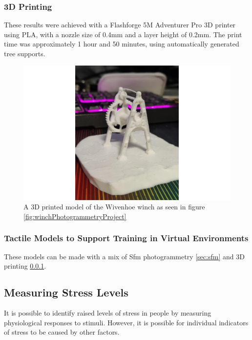 \documentclass[12pt]{article}
\begin{document}
\subsubsection{3D Printing} \label{sec:3dprinting}

These results were achieved with a Flashforge 5M Adventurer Pro \cite{FlashForgeAdventurer5MPro} 3D printer using PLA, with a nozzle size of 0.4mm and a layer height of 0.2mm. The print time was approximately 1 hour and 50 minutes, using automatically generated tree supports.

\begin{figure}[h]
  \centering
  \begin{minipage}[b]{0.7\linewidth}
    \includegraphics[width=\linewidth]{images/winch 3d model.png}
    \caption{A 3D printed model of the Wivenhoe winch as seen in figure \ref{fig:winchPhotogrammetryProject}}
    \label{fig:winch3dmodel}
  \end{minipage}
\end{figure}

\subsubsection{Tactile Models to Support Training in Virtual Environments}

These models can be made with a mix of Sfm photogrammetry \ref{sec:sfm} and 3D printing \ref{sec:3dprinting}.

\subsection{Measuring Stress Levels}

It is possible to identify raised levels of stress in people by measuring physiological responses to stimuli. However, it is possible for individual indicators of stress to be caused by other factors.
\end{document}
